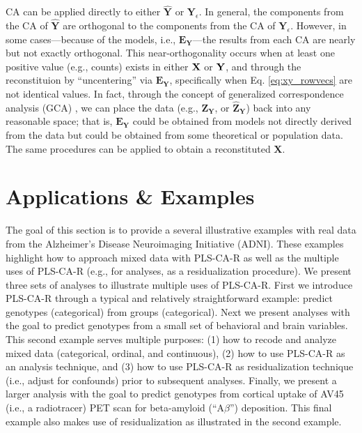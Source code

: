 \documentclass[12pt]{article}
\begin{document}
CA can be applied directly to either \(\widehat{\mathbf Y}\) or
\({\mathbf Y}_{\epsilon}\). In general, the components from the CA of
\(\widehat{\mathbf Y}\) are orthogonal to the components from the CA of
\({\mathbf Y}_{\epsilon}\). However, in some cases---because of the
models, i.e., \({\mathbf E}_{\mathbf Y}\)---the results from each CA are
nearly but not exactly orthogonal. This near-orthogonality occurs when
at least one positive value (e.g., counts) exists in either \({\bf X}\)
or \({\bf Y}\), and through the reconstituion by ``uncentering'' via
\({\mathbf E}_{\mathbf Y}\), specifically when Eq. \ref{eq:xy_rowvecs}
are not identical values. In fact, through the concept of generalized
correspondence analysis (GCA)
\citetext{\citealp{escofier1983analyse}; \citealp{escofier1984analyse}; \citealp[for
more details and background see also][]{beaton2018generalization}}, we
can place the data (e.g., \({\mathbf Z}_{\mathbf Y}\), or
\(\widehat{{\mathbf Z}}_{\mathbf Y}\)) back into any reasonable space;
that is, \({\mathbf E}_{\mathbf Y}\) could be obtained from models not
directly derived from the data but could be obtained from some
theoretical or population data. The same procedures can be applied to
obtain a reconstituted \({\mathbf X}\).

\hypertarget{applications-examples}{%
\section{Applications \& Examples}\label{applications-examples}}

\label{section:appex}

The goal of this section is to provide a several illustrative examples
with real data from the Alzheimer's Disease Neuroimaging Initiative
(ADNI). These examples highlight how to approach mixed data with
PLS-CA-R as well as the multiple uses of PLS-CA-R (e.g., for analyses,
as a residualization procedure). We present three sets of analyses to
illustrate multiple uses of PLS-CA-R. First we introduce PLS-CA-R
through a typical and relatively straightforward example: predict
genotypes (categorical) from groups (categorical). Next we present
analyses with the goal to predict genotypes from a small set of
behavioral and brain variables. This second example serves multiple
purposes: (1) how to recode and analyze mixed data (categorical,
ordinal, and continuous), (2) how to use PLS-CA-R as an analysis
technique, and (3) how to use PLS-CA-R as residualization technique
(i.e., adjust for confounds) prior to subsequent analyses. Finally, we
present a larger analysis with the goal to predict genotypes from
cortical uptake of AV45 (i.e., a radiotracer) PET scan for beta-amyloid
(``A\(\beta\)'') deposition. This final example also makes use of
residualization as illustrated in the second example.
\end{document}
